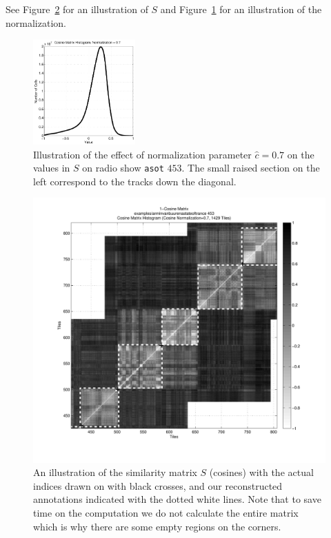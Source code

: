 \documentclass[twocolumn]{article}
\begin{document}
	See Figure~\ref{fig:simmatrix} for an illustration of $S$ and Figure~\ref{fig:cosine_norm} for an illustration of the  normalization.
	
		\begin{figure}
			\centering
			\includegraphics[width=0.35\textwidth]{images/cosine_histogram}
			
			\caption{Illustration of the effect of normalization parameter $\hat c=0.7$ on the values in $S$ on radio show \texttt{asot} $453$. The small raised section on the left correspond to the tracks down the diagonal.}
			\label{fig:cosine_norm}
		\end{figure} 
	
	\begin{figure}[t]
		\centering
		\includegraphics[width=1.08\textwidth]{images/cosines}
		\caption{An illustration of the similarity matrix $S$ (cosines) with the actual indices drawn on with black crosses, and our reconstructed annotations indicated with the dotted white lines. Note that to save time on the computation we do not calculate the entire matrix which is why there are some empty regions on the corners.}
		\label{fig:simmatrix}
	\end{figure} 
	
\end{document}
